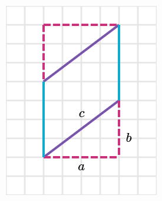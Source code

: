 \begin{solutionbox}{14cm}
\begin{minipage}{0.4\textwidth}
\begin{multicols}{2}
\begin{figure}[H]
                \includegraphics[width=0.9\linewidth]{../images/peri_paralelogramo_01b.png}
                \caption{}
                \label{fig:peri_paralelogramo_01b}
            \end{figure}
        \end{multicols}
        \begin{multicols}{2}
            \begin{figure}[H]
                \centering

\end{figure}
\end{multicols}
\end{minipage}
\end{solutionbox}

